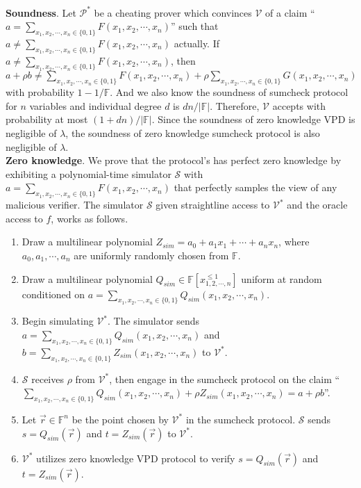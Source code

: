 \noindent
\textbf{Soundness}. Let $\mathcal{P}^*$ be a cheating prover which convinces $\mathcal{V}$ of a claim ``$a = \sum\limits_{x_1, x_2, \cdots, x_n \in \{0, 1\}}F(x_1, x_2, \cdots, x_n)$'' such that $a \neq \sum\limits_{x_1, x_2, \cdots, x_n \in \{0, 1\}}F(x_1, x_2, \cdots, x_n)$ actually. If $a \neq \sum\limits_{x_1, x_2, \cdots, x_n \in \{0, 1\}}F(x_1, x_2, \cdots, x_n)$, then $a + \rho b \neq \sum\limits_{x_1, x_2, \cdots, x_n \in \{0, 1\}}F(x_1, x_2, \cdots, x_n) + \rho \sum\limits_{x_1, x_2, \cdots, x_n \in \{0, 1\}}G(x_1, x_2, \cdots, x_n)$ with probability $1 - 1 / \mathbb{F}$. And we also know the soundness of sumcheck protocol for $n$ variables and individual degree $d$ is $d n /|\mathbb{F}|$. Therefore, $\mathcal{V}$ accepts with probability at most $(1 + dn) / |\mathbb{F}|$. Since the soundness of zero knowledge VPD is negligible of $\lambda$, the soundness of zero knowledge sumcheck protocol is also negligible of $\lambda$.\\

\noindent
\textbf{Zero knowledge}. We prove that the protocol's has perfect zero knowledge by exhibiting a polynomial-time simulator $\mathcal{S}$ with $a = \sum\limits_{x_1, x_2, \cdots, x_n \in \{0, 1\}}F(x_1, x_2, \cdots, x_n)$ that perfectly samples the view of any malicious verifier. The simulator $\mathcal{S}$ given straightline access to $\mathcal{V^*}$ and the oracle access to $f$, works as follows.

\begin{enumerate}

\item Draw a multilinear polynomial $Z_{sim} = a_0 + a_1x_1 + \cdots + a_nx_n$, where $a_0, a_1, \cdots, a_n$ are uniformly randomly chosen from $\mathbb{F}$. 

\item Draw a multilinear polynomial $Q_{sim} \in \mathbb{F}[x_{1, 2, \cdots, n}^{\leqslant 1}]$ uniform at random conditioned on $a = \sum\limits_{x_1, x_2, \cdots, x_n \in \{0, 1\}}Q_{sim}(x_1, x_2, \cdots, x_n)$.

\item Begin simulating $\mathcal{V}^*$. The simulator sends $a = \sum\limits_{x_1, x_2, \cdots, x_n \in \{0, 1\}}Q_{sim}(x_1, x_2, \cdots, x_n)$ and $b = \sum\limits_{x_1, x_2, \cdots, x_n \in \{0, 1\}}Z_{sim}(x_1, x_2, \cdots, x_n)$ to $\mathcal{V}^*$. 

\item $\mathcal{S}$ receives $\rho$ from $\mathcal{V^*}$, then engage in the sumcheck protocol on the claim ``$\sum\limits_{x_1, x_2, \cdots, x_n \in \{0, 1\}}Q_{sim}(x_1, x_2, \cdots, x_n) + \rho Z_{sim}(x_1, x_2, \cdots, x_n) = a + \rho b$''. 

\item Let $\vec{r} \in \mathbb{F}^n$ be the point chosen by $\mathcal{V}^*$ in the sumcheck protocol. $\mathcal{S}$ sends $s = Q_{sim}(\vec{r})$ and $t = Z_{sim}(\vec{r})$ to $\mathcal{V^*}$. 

\item $\mathcal{V}^*$ utilizes zero knowledge VPD protocol to verify $s = Q_{sim}(\vec{r})$ and $t = Z_{sim}(\vec{r})$. 

\end{enumerate} 

